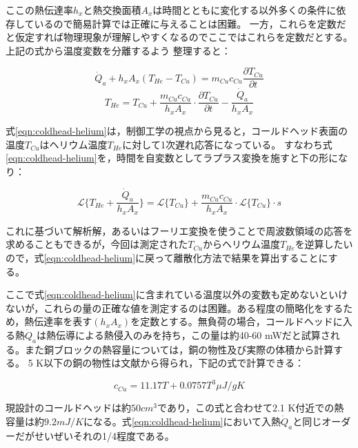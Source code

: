 ここの熱伝達率$h_x$と熱交換面積$A_x$は時間とともに変化する以外多くの条件に依存しているので簡易計算では正確に与えることは困難。
一方，これらを定数だと仮定すれば物理現象が理解しやすくなるのでここではこれらを定数だとする。上記の式から温度変数を分離するよう
整理すると：

\begin{equation}
\dot Q_a +h_xA_x(T_{He} - T_{Cu}) = m_{Cu} c_{Cu} \frac{\partial T_{Cu}}{\partial t}
\end{equation}
\begin{equation}
T_{He} = T_{Cu} + \frac{m_{Cu} c_{Cu}}{h_x A_x} \cdot \frac{\partial T_{Cu}}{\partial t} - \frac{\dot Q_a}{h_x A_x}
\label{eqn:coldhead-helium}
\end{equation}

式\ref{eqn:coldhead-helium}は，制御工学の視点から見ると，コールドヘッド表面の温度$T_{Cu}$はヘリウム温度$T_{He}$に対して1次遅れ応答になっている。
すなわち式\ref{eqn:coldhead-helium}を，時間を自変数としてラプラス変換を施すと下の形になり：

\begin{equation}
\mathcal{L} \{T_{He} + \frac{\dot Q_a}{h_x A_x}\} = \mathcal{L} \{ T_{Cu}\} + \frac{m_{Cu} c_{Cu}}{h_x A_x} \cdot \mathcal{L} \{ T_{Cu}\} \cdot s
\label{eqn:coldhead-helium_laplace}
\end{equation}


これに基づいて解析解，あるいはフーリエ変換を使うことで周波数領域の応答を求めることもできるが，今回は測定された$T_{Cu}$からヘリウム温度$T_{He}$を逆算したいので，式\ref{eqn:coldhead-helium}に戻って離散化方法で結果を算出することにする。

ここで式\ref{eqn:coldhead-helium}に含まれている温度以外の変数も定めないといけないが，これらの量の正確な値を測定するのは困難。ある程度の簡略化をするため，熱伝達率を表す$(h_x A_x)$を定数とする。無負荷の場合，コールドヘッドに入る熱$\dot Q_a$は熱伝導による熱侵入のみを持ち，この量は約40-60 mWだと試算される。また銅ブロックの熱容量については，銅の物性及び実際の体積から計算する。
5 K以下の銅の物性は文献\cite{copper_cp}から得られ，下記の式で計算できる：

\begin{equation}
c_{Cu} = 11.17T + 0.0757T^3 \mu J/gK
\label{eqn:copper_cp}
\end{equation}

現設計のコールドヘッドは約$50cm^3$であり，この式と合わせて2.1 K付近での熱容量は約$9.2mJ/K$になる。式\ref{eqn:coldhead-helium}において入熱$\dot Q_a$と同じオーダーだがせいぜいそれの1/4程度である。


